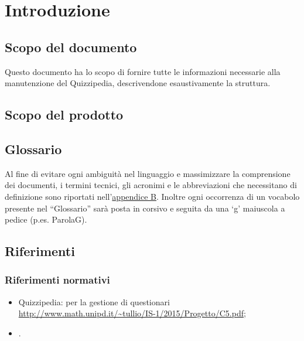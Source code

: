 \documentclass[a4paper, titlepage]{article}
\begin{document}
\pagestyle{fancy}	

\maketitle



\newpage
\tableofcontents

\newpage
\listoffigures

\newpage
\listoftables

\newpage
\clearpage
{}

	\section{Introduzione}
	\subsection{Scopo del documento}
	Questo documento ha lo scopo di fornire tutte le informazioni necessarie alla manutenzione del 
	Quizzipedia, descrivendone esaustivamente la struttura.
	
	\subsection{Scopo del prodotto}
	\SCOPO
	
	\subsection{Glossario}
	Al fine di evitare ogni ambiguità nel linguaggio e massimizzare la comprensione dei documenti, i termini tecnici, gli acronimi e le abbreviazioni che necessitano di definizione sono riportati nell'\hyperref[gl]{appendice B}.
	Inoltre ogni occorrenza di un vocabolo presente nel “Glossario” sarà posta in corsivo e seguita da
	una ‘g’ maiuscola a pedice (p.es. ParolaG).
	
	\subsection{Riferimenti}	
	\subsubsection{Riferimenti normativi}
	\begin{itemize}
		\item {} Quizzipedia:  per la gestione di questionari \newline \url{http://www.math.unipd.it/~tullio/IS-1/2015/Progetto/C5.pdf};
		\item {} \NdPdoc.
	\end{itemize}
	\newpage
\end{document}
